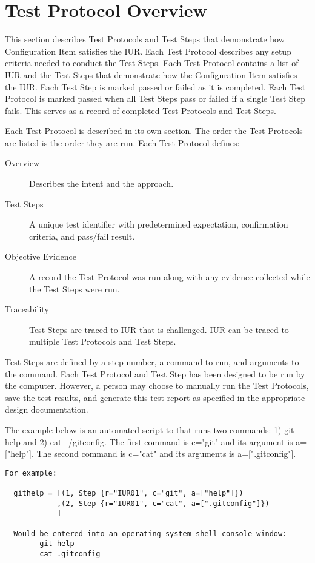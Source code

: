 \newpage
\section{Test Protocol Overview}
This section describes Test Protocols and Test Steps that demonstrate how
Configuration Item satisfies the IUR.  Each Test Protocol describes any setup
criteria needed to conduct the Test Steps. Each Test Protocol contains a list of
IUR and the Test Steps that demonstrate how the Configuration Item satisfies the
IUR. Each Test Step is marked passed or failed as it is completed.  Each Test
Protocol is marked passed when all Test Steps pass or failed if a single Test
Step fails.  This serves as a record of completed Test Protocols and Test Steps.

Each Test Protocol is described in its own section.  The order the Test
Protocols are listed is the order they are run.  Each Test Protocol defines:
\begin{description}

\item[Overview] \quad
Describes the intent and the approach.

\item[Test Steps] \quad
A unique test identifier with predetermined expectation,
confirmation criteria, and pass/fail result.

\item[Objective Evidence] \quad
A record the Test Protocol was run along with any evidence collected while
the Test Steps were run.

\item[Traceability] \quad
Test Steps are traced to IUR that is challenged. IUR can be traced to
multiple Test Protocols and Test Steps.

\end{description}

Test Steps are defined by a step number, a command to run, and arguments to the
command.  Each Test Protocol and Test Step has been designed to be run by the
computer.  However, a person may choose to manually run the Test Protocols,
save the test results, and generate this test report as specified in the
appropriate design documentation.

The example below is an automated script to that runs two commands: 1) git help
and 2) cat ~/gitconfig.  The first command is c="git" and its argument is
a=["help"].  The second command is c="cat" and its arguments is
a=[".gitconfig"].

\begin{verbatim}
For example:

  githelp = [(1, Step {r="IUR01", c="git", a=["help"]})
            ,(2, Step {r="IUR01", c="cat", a=[".gitconfig"]})
            ]

  Would be entered into an operating system shell console window:
        git help
        cat .gitconfig
\end{verbatim}

